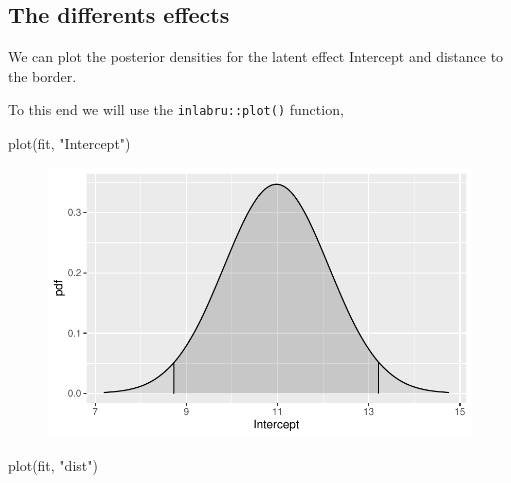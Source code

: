 \documentclass[
  a4paper,
]{article}
\newenvironment{Shaded}{\begin{snugshade}}{\end{snugshade}}
\newcommand{\FunctionTok}[1]{\textcolor[rgb]{0.28,0.35,0.67}{#1}}
\newcommand{\NormalTok}[1]{\textcolor[rgb]{0.00,0.23,0.31}{#1}}
\newcommand{\StringTok}[1]{\textcolor[rgb]{0.13,0.47,0.30}{#1}}
\begin{document}
\hypertarget{the-differents-effects}{%
\subsection{The differents effects}\label{the-differents-effects}}

We can plot the posterior densities for the latent effect Intercept and
distance to the border.

To this end we will use the \texttt{inlabru::plot()} function,

\begin{Shaded}
\begin{Highlighting}[]
\FunctionTok{plot}\NormalTok{(fit, }\StringTok{"Intercept"}\NormalTok{)}
\end{Highlighting}
\end{Shaded}

\begin{figure}[H]

{\centering \includegraphics{pedometron_files/figure-pdf/unnamed-chunk-11-1.pdf}

}

\end{figure}

\begin{Shaded}
\begin{Highlighting}[]
\FunctionTok{plot}\NormalTok{(fit, }\StringTok{"dist"}\NormalTok{)}
\end{Highlighting}
\end{Shaded}
\end{document}
